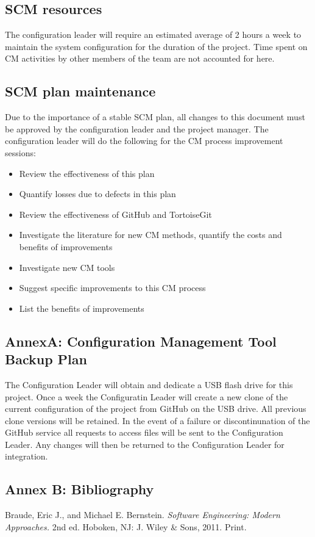 \documentclass{scrartcl}
\begin{document}
\subsection{SCM resources}
The configuration leader will require an estimated average of 2 hours a week to maintain the system configuration for the duration of the project.  Time spent on CM activities by other members of the team are not accounted for here.

\subsection{SCM plan maintenance}
Due to the importance of a stable SCM plan, all changes to this document must be approved by the configuration leader and the project manager.
\newline \newline
The configuration leader will do the following for the CM process improvement sessions:
\begin{itemize}
\item Review the effectiveness of this plan
\item Quantify losses due to defects in this plan
\item Review the effectiveness of GitHub and TortoiseGit
\item Investigate the literature for new CM methods, quantify the costs and benefits of improvements
\item Investigate new CM tools
\item Suggest specific improvements to this CM process
\item List the benefits of improvements
\end{itemize}

\newpage
\setcounter{secnumdepth}{0} 
\subsection{AnnexA: Configuration Management Tool Backup Plan}
The Configuration Leader will obtain and dedicate a USB flash drive for this project.  Once a week the Configuratin Leader will create a new clone of the current configuration of the project from GitHub on the USB drive.  All previous clone versions will be retained.  In the event of a failure or discontinunation of the GitHub service all requests to access files will be sent to the Configuration Leader.  Any changes will then be returned to the Configuration Leader for integration. 
\newpage
\subsection{Annex B: Bibliography}
Braude, Eric J., and Michael E. Bernstein. \textit{Software Engineering: Modern Approaches.} 2nd ed. Hoboken, NJ: J. Wiley \& Sons, 2011. Print.
\newline
\end{document}
